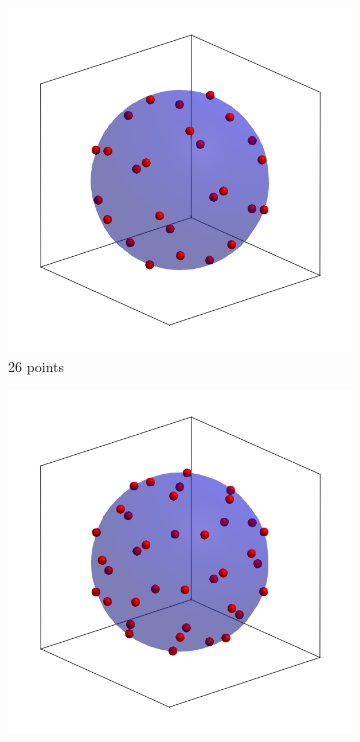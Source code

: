\documentclass[main.tex]{subfiles}
\begin{document}
\begin{figure}
\begin{minipage}{0.55\linewidth}
		\begin{subfigure}{0.5\linewidth}
			\centering
			\includegraphics[width=\linewidth]{figures/gcmc/lebedev_26}
			\caption{26 points}
		\end{subfigure}%
		\begin{subfigure}{0.5\linewidth}
			\centering
			\includegraphics[width=\linewidth]{figures/gcmc/lebedev_38}

\end{subfigure}
\end{minipage}
\end{figure}
\end{document}
